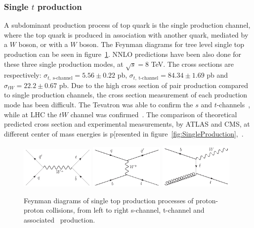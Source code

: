 
\subsubsection{Single $t$ production}
\label{subsec:topsing}

A subdominant production process of top quark is the single production channel, where the top quark is produced in association with another quark, mediated by a $W$ boson, or with a $W$ boson. The Feynman diagrams for tree level single top production can be seen in figure~\ref{fig:SingleProductionFD}. NNLO predictions have been also done for these three single production modes, at $\sqrt{s}=8$ TeV. The cross sections are respectively: $\sigma_{t,\; \text{s-channel}}=5.56\pm0.22$ pb, $\sigma_{t,\; \text{t-channel}}=84.34\pm1.69$ pb and $\sigma_{tW}=22.2\pm0.67$ pb. Due to the high cross section of pair production compared to single production channels, the cross section measurement of each production mode has been difficult. The Tevatron was able to confirm the $s$ and $t$-channels~\cite{Abazov:2009ii, Aaltonen:2009jj}, while at LHC the $tW$ channel was confirmed~\cite{Aad:2012xca, Chatrchyan:1642680}. The comparison of theoretical predicted cross section and experimental measurements, by ATLAS and CMS, at different center of mass energies is p[resented in figure~\ref{fig:SingleProduction},~\cite{TOPLHCWG}.

\begin{figure}[!Hhtbp]
  \begin{center}
    \includegraphics[width=0.32\textwidth]{figs/Schannel_top_single.jpg}
    \includegraphics[width=0.32\textwidth]{figs/Tchannel_top_single.jpg}
    \includegraphics[width=0.32\textwidth]{figs/TWchannel_top_single.jpg}
    \caption{Feynman diagrams of single top production processes of proton-proton collisions, from left to right s-channel, t-channel and associated \W~production.}
    \label{fig:SingleProductionFD}
  \end{center}
\end{figure}

